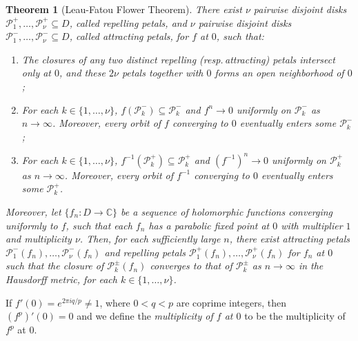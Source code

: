 \documentclass[a4paper,reqno,times, 11pt]{amsart}
\newtheorem{theorem}{Theorem}[section]
\theoremstyle{remark}
\theoremstyle{plain}
\numberwithin{equation}{section}
\def\PPP{{\cal P}}
\def\C{\mbox{$\mathbb C$}}
\def\cal{\mathcal}
\begin{document}
\begin{theorem}[Leau-Fatou Flower Theorem]\label{thm:flower}
There exist $\nu$ pairwise disjoint disks $\PPP_1^+,\ldots,\PPP_\nu^+\subseteq D$, called \emph{repelling petals}, and $\nu$ pairwise disjoint disks $\PPP_1^-,\ldots,\PPP_\nu^-\subseteq D$, called \emph{attracting petals}, for $f$ at $0$, such that:
\begin{enumerate}
\item The closures of any two distinct repelling  (resp.\,attracting) petals intersect only at $0$, and these $2\nu$ petals together with $0$ forms an open neighborhood of $0$;
\item For each $k\in\{1,\dots,\nu\}$, $f(\PPP_k^-)\subseteq \PPP_k^-$ and $f^n\to0$ uniformly on $\PPP_k^-$ as $n\to\infty$. Moreover, every orbit of $f$ converging to $0$ eventually enters some $\PPP_k^-$;
\item For each $k\in\{1,\dots,\nu\}$, $f^{-1}(\PPP_k^+)\subseteq \PPP_k^+$ and $(f^{-1})^n\to0$ uniformly on $\PPP_k^+$ as $n\to\infty$. Moreover, every orbit of $f^{-1}$ converging to $0$ eventually enters some $\PPP_k^+$.
\end{enumerate}
Moreover, let $\{f_n:D\to\C\}$ be a sequence of holomorphic functions converging uniformly to $f$, such that each $f_n$ has a parabolic fixed point at $0$ with multiplier $1$ and multiplicity $\nu$. Then, for each sufficiently large $n$, there exist attracting petals $\PPP_1^-(f_n),\dots,\PPP_\nu^-(f_n)$ and repelling petals $\PPP_1^+(f_n),\dots,\PPP_\nu^+(f_n)$ for $f_n$ at $0$ such that the closure of $\PPP_k^\pm(f_n)$ converges to that of $\PPP_k^\pm$ as $n\to\infty$ in the Hausdorff metric, for each $k\in\{1,\dots,\nu\}$.
\end{theorem}

If $f'(0)=e^{2\pi iq/p}\not=1$, where $0<q<p$ are coprime integers, then $(f^p)'(0)=0$ and we define the \emph{multiplicity of $f$ at $0$} to be the multiplicity of $f^p$ at $0$.
\end{document}
